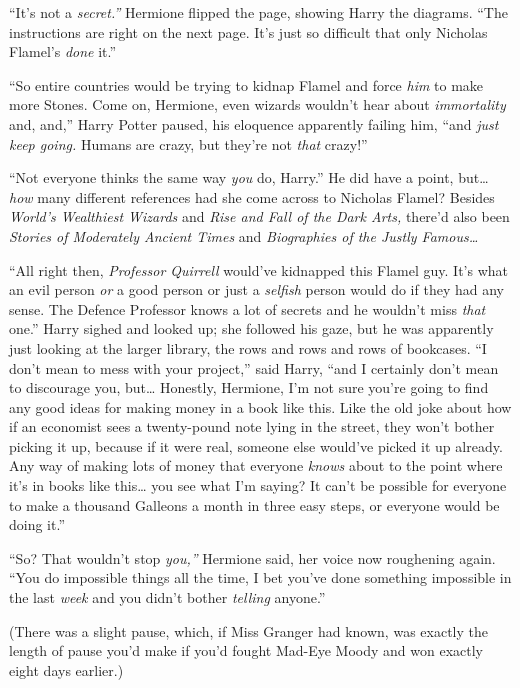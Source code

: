 ``It's not a \emph{secret.''} Hermione flipped the page, showing Harry
the diagrams. ``The instructions are right on the next page. It's just
so difficult that only Nicholas Flamel's \emph{done} it.''

``So entire countries would be trying to kidnap Flamel and force
\emph{him} to make more Stones. Come on, Hermione, even wizards wouldn't
hear about \emph{immortality} and, and,'' Harry Potter paused, his
eloquence apparently failing him, ``and \emph{just keep going.} Humans
are crazy, but they're not \emph{that} crazy!''

``Not everyone thinks the same way \emph{you} do, Harry.'' He did have a
point, but\ldots{} \emph{how} many different references had she come
across to Nicholas Flamel? Besides \emph{World's Wealthiest Wizards} and
\emph{Rise and Fall of the Dark Arts,} there'd also been \emph{Stories
of Moderately Ancient Times} and \emph{Biographies of the Justly
Famous\ldots{}}

``All right then, \emph{Professor Quirrell} would've kidnapped this
Flamel guy. It's what an evil person \emph{or} a good person or just a
\emph{selfish} person would do if they had any sense. The Defence
Professor knows a lot of secrets and he wouldn't miss \emph{that} one.''
Harry sighed and looked up; she followed his gaze, but he was apparently
just looking at the larger library, the rows and rows and rows of
bookcases. ``I don't mean to mess with your project,'' said Harry, ``and
I certainly don't mean to discourage you, but\ldots{} Honestly,
Hermione, I'm not sure you're going to find any good ideas for making
money in a book like this. Like the old joke about how if an economist
sees a twenty-pound note lying in the street, they won't bother picking
it up, because if it were real, someone else would've picked it up
already. Any way of making lots of money that everyone \emph{knows}
about to the point where it's in books like this\ldots{} you see what
I'm saying? It can't be possible for everyone to make a thousand
Galleons a month in three easy steps, or everyone would be doing it.''

``So? That wouldn't stop \emph{you,''} Hermione said, her voice now
roughening again. ``You do impossible things all the time, I bet you've
done something impossible in the last \emph{week} and you didn't bother
\emph{telling} anyone.''

(There was a slight pause, which, if Miss Granger had known, was exactly
the length of pause you'd make if you'd fought Mad-Eye Moody and won
exactly eight days earlier.)

